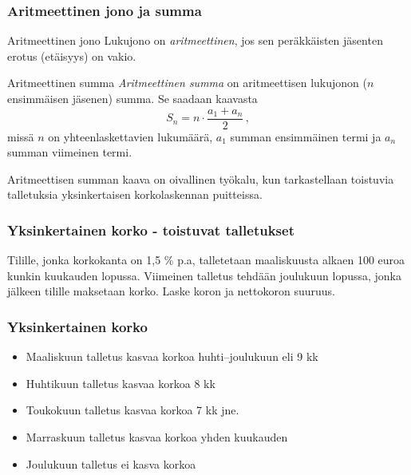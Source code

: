 \documentclass{beamer}
\begin{document}
\begin{frame}
    \frametitle{Aritmeettinen jono ja summa}
    \begin{block}{Aritmeettinen jono}
        Lukujono \pause on \emph{aritmeettinen}, jos sen peräkkäisten jäsenten erotus (etäisyys) on vakio.
    \end{block}
    \pause
    \begin{block}{Aritmeettinen summa}
        \emph{Aritmeettinen summa} \pause on aritmeettisen lukujonon ($n$ ensimmäisen jäsenen) summa. \pause Se saadaan kaavasta
        \[
            S_n = n \cdot \frac{a_1 + a_n}{2}\,,
        \]
        \pause missä $n$ on yhteenlaskettavien lukumäärä, \pause $a_1$ summan ensimmäinen termi ja \pause $a_n$ summan viimeinen termi.
    \end{block}
    \pause
    Aritmeettisen summan kaava on oivallinen työkalu, kun tarkastellaan toistuvia talletuksia yksinkertaisen korkolaskennan puitteissa.
\end{frame}

\begin{frame}
    \frametitle{Yksinkertainen korko - toistuvat talletukset}
    \begin{esim}
        Tilille, jonka korkokanta on 1,5 \% p.a, talletetaan maaliskuusta alkaen 100 euroa kunkin kuukauden lopussa.
        Viimeinen talletus tehdään joulukuun lopussa, jonka jälkeen tilille maksetaan korko. Laske koron ja nettokoron suuruus.
    \end{esim}
\end{frame}

\begin{frame}
    \frametitle{Yksinkertainen korko}
	\begin{ratkaisu}
		\begin{itemize}
			\item Maaliskuun talletus kasvaa korkoa huhti--joulukuun eli 9 kk
			\item Huhtikuun talletus kasvaa korkoa 8 kk
			\item Toukokuun talletus kasvaa korkoa 7 kk jne.
			\item Marraskuun talletus kasvaa korkoa yhden kuukauden
			\item Joulukuun talletus ei kasva korkoa
		\end{itemize}
	\end{ratkaisu}
\end{frame}
\end{document}
